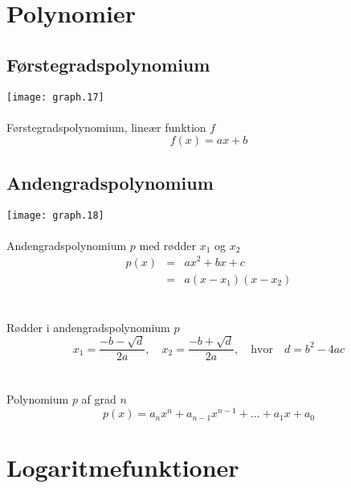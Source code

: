 \documentclass[11pt,a5paper,fleqn,leqno]{book}
\begin{document}
\newpage

\section{Polynomier}

\subsection{Førstegradspolynomium}

\texttt{[image: graph.17]}
\\
\\
Førstegradspolynomium, lineær funktion $f$
\begin{equation}
f(x) = ax+b
\end{equation}

\newpage

\subsection{Andengradspolynomium}

\texttt{[image: graph.18]}
\\
\\
Andengradspolynomium $p$ med rødder $x_1$ og $x_2$
\begin{eqnarray}
p(x) & = & ax^2 + bx + c \\
 & = & a(x-x_1)(x-x_2) \nonumber
\end{eqnarray}
\\
\\
Rødder i andengradspolynomium $p$
\begin{equation}
x_1 = \frac{-b - \sqrt{d}}{2a}, \quad x_2 = \frac{-b + \sqrt{d}}{2a}, \quad \text{hvor} \quad d = b^2 - 4ac
\end{equation}
\\
\\
Polynomium $p$ af grad $n$
\begin{equation}
p(x) = a_nx^n + a_{n-1}x^{n-1} + \dots + a_1x + a_0
\end{equation}

\vfill

\section{Logaritmefunktioner}
\end{document}
